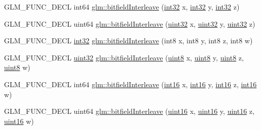 \begin{DoxyCompactItemize}
\item 
G\+L\+M\+\_\+\+F\+U\+N\+C\+\_\+\+D\+E\+C\+L int64 \hyperlink{group__gtc__bitfield_ga64e2d84f6560af3cc639644b1e628c42}{glm\+::bitfield\+Interleave} (\hyperlink{stb__image_8c_a43d43196463bde49cb067f5c20ab8481}{int32} x, \hyperlink{stb__image_8c_a43d43196463bde49cb067f5c20ab8481}{int32} y, \hyperlink{stb__image_8c_a43d43196463bde49cb067f5c20ab8481}{int32} z)
\item 
G\+L\+M\+\_\+\+F\+U\+N\+C\+\_\+\+D\+E\+C\+L uint64 \hyperlink{group__gtc__bitfield_ga7c10eb37f608365cfaef5ca2c476e1ce}{glm\+::bitfield\+Interleave} (\hyperlink{stb__image_8c_a1134b580f8da4de94ca6b1de4d37975e}{uint32} x, \hyperlink{stb__image_8c_a1134b580f8da4de94ca6b1de4d37975e}{uint32} y, \hyperlink{stb__image_8c_a1134b580f8da4de94ca6b1de4d37975e}{uint32} z)
\item 
G\+L\+M\+\_\+\+F\+U\+N\+C\+\_\+\+D\+E\+C\+L \hyperlink{stb__image_8c_a43d43196463bde49cb067f5c20ab8481}{int32} \hyperlink{group__gtc__bitfield_ga7da84ecc2b3a46c9c08a9f40012359cf}{glm\+::bitfield\+Interleave} (int8 x, int8 y, int8 z, int8 w)
\item 
G\+L\+M\+\_\+\+F\+U\+N\+C\+\_\+\+D\+E\+C\+L \hyperlink{stb__image_8c_a1134b580f8da4de94ca6b1de4d37975e}{uint32} \hyperlink{group__gtc__bitfield_ga447c0bbed9d60c14578626d8f03f3755}{glm\+::bitfield\+Interleave} (\hyperlink{stb__image_8c_adde6aaee8457bee49c2a92621fe22b79}{uint8} x, \hyperlink{stb__image_8c_adde6aaee8457bee49c2a92621fe22b79}{uint8} y, \hyperlink{stb__image_8c_adde6aaee8457bee49c2a92621fe22b79}{uint8} z, \hyperlink{stb__image_8c_adde6aaee8457bee49c2a92621fe22b79}{uint8} w)
\item 
G\+L\+M\+\_\+\+F\+U\+N\+C\+\_\+\+D\+E\+C\+L int64 \hyperlink{group__gtc__bitfield_ga09ee0be0fac790a1607a711e597dd9bf}{glm\+::bitfield\+Interleave} (\hyperlink{stb__image_8c_a259fa4834387bd68627ddf37bb3ebdb9}{int16} x, \hyperlink{stb__image_8c_a259fa4834387bd68627ddf37bb3ebdb9}{int16} y, \hyperlink{stb__image_8c_a259fa4834387bd68627ddf37bb3ebdb9}{int16} z, \hyperlink{stb__image_8c_a259fa4834387bd68627ddf37bb3ebdb9}{int16} w)
\item 
G\+L\+M\+\_\+\+F\+U\+N\+C\+\_\+\+D\+E\+C\+L uint64 \hyperlink{group__gtc__bitfield_gac8a926a7bfd9b23c22a4f685193fbfe1}{glm\+::bitfield\+Interleave} (\hyperlink{stb__image_8c_a05f6b0ae8f6a6e135b0e290c25fe0e4e}{uint16} x, \hyperlink{stb__image_8c_a05f6b0ae8f6a6e135b0e290c25fe0e4e}{uint16} y, \hyperlink{stb__image_8c_a05f6b0ae8f6a6e135b0e290c25fe0e4e}{uint16} z, \hyperlink{stb__image_8c_a05f6b0ae8f6a6e135b0e290c25fe0e4e}{uint16} w)
\end{DoxyCompactItemize}


